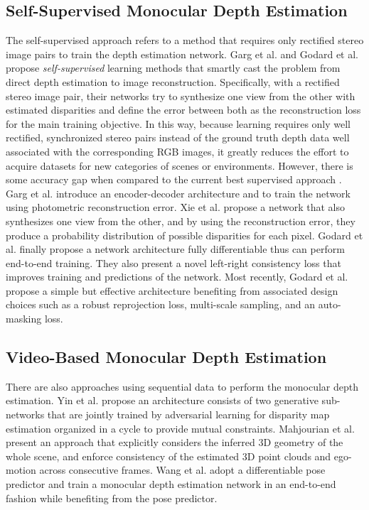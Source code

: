 \documentclass[10pt,twocolumn,letterpaper]{article}
\begin{document}
\subsection{Self-Supervised Monocular Depth Estimation}
The self-supervised approach refers to a method that requires only rectified stereo image pairs to train the depth estimation network.
Garg et al. \cite{garg2016unsupervised} and Godard et al. \cite{godard2017unsupervised} propose \textit{self-supervised} learning methods that smartly cast the problem from direct depth estimation to image reconstruction.
Specifically, with a rectified stereo image pair, their networks try to synthesize one view from the other with estimated disparities and define the error between both as the reconstruction loss for the main training objective.
In this way, because learning requires only well rectified, synchronized stereo pairs instead of the ground truth depth data well associated with the corresponding RGB images, it greatly reduces the effort to acquire datasets for new categories of scenes or environments.
However, there is some accuracy gap when compared to the current best supervised approach \cite{yin2019enforcing}.
Garg et al. \cite{garg2016unsupervised} introduce an encoder-decoder architecture and to train the network using photometric reconstruction error. 
Xie et al. \cite{xie2016deep3d} propose a network that also synthesizes one view from the other, and by using the reconstruction error, they produce a probability distribution of possible disparities for each pixel.
Godard et al. \cite{godard2017unsupervised} finally propose a network architecture fully differentiable thus can perform end-to-end training.
They also present a novel left-right consistency loss that improves training and predictions of the network.
Most recently, Godard et al. \cite{godard2019digging} propose a simple but effective architecture benefiting from associated design choices such as a robust reprojection loss, multi-scale sampling, and an auto-masking loss.

\subsection{Video-Based Monocular Depth Estimation}
There are also approaches using sequential data to perform the monocular depth estimation.
Yin et al. \cite{yin2018geonet} propose an architecture consists of two generative sub-networks that are jointly trained by adversarial learning for disparity map estimation organized in a cycle to provide mutual constraints.
Mahjourian et al. \cite{mahjourian2018unsupervised} present an approach that explicitly considers the inferred 3D geometry of the whole scene, and enforce consistency of the estimated 3D point clouds and ego-motion across consecutive frames.
Wang et al. \cite{wang2018learning} adopt a differentiable pose predictor and train a monocular depth estimation network in an end-to-end fashion while benefiting from the pose predictor.
\end{document}
